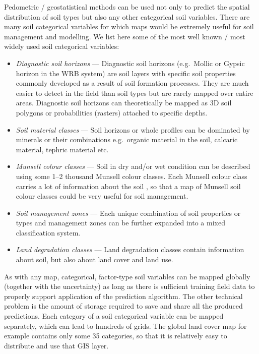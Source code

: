 \documentclass[graybox,natbib,nospthms,UStrade]{svmono}
\begin{document}
Pedometric / geostatistical methods can be used not only to predict the
spatial distribution of soil types but also any other categorical soil
variables. There are many soil categorical variables for which maps
would be extremely useful for soil management and modelling. We list
here some of the most well known / most widely used soil categorical
variables:

\begin{itemize}
\item
  \emph{Diagnostic soil horizons} --- Diagnostic soil horizons (e.g.~Mollic
  or Gypsic horizon in the WRB system) are soil layers with specific
  soil properties commonly developed as a result of soil
  formation processes. They are much easier to detect in the field
  than soil types but are rarely mapped over entire areas. Diagnostic
  soil horizons can theoretically be mapped as 3D soil polygons or
  probabilities (rasters) attached to specific depths.
\item
  \emph{Soil material classes} --- Soil horizons or whole profiles can be
  dominated by minerals or their combinations e.g.~organic material in
  the soil, calcaric material, tephric material etc.
\item
  \emph{Munsell colour classes} --- Soil in dry and/or wet condition can be
  described using some 1--2 thousand Munsell colour classes. Each
  Munsell colour class carries a lot of information about the soil
  \citep{fernandez1988color}, so that a map of Munsell soil colour classes
  could be very useful for soil management.
\item
  \emph{Soil management zones} --- Each unique combination of soil properties
  or types and management zones can be further expanded into a mixed
  classification system.
\item
  \emph{Land degradation classes} --- Land degradation classes contain
  information about soil, but also about land cover and land use.
\end{itemize}

As with any map, categorical, factor-type soil variables can be mapped
globally (together with the uncertainty) as long as there is sufficient
training field data to properly support application of the prediction
algorithm. The other technical problem is the amount of storage required to save and
share all the produced predictions. Each category of a soil categorical
variable can be mapped separately, which can lead to hundreds of grids.
The global land cover map for example contains only some 35 categories,
so that it is relatively easy to distribute and use that GIS layer.
\end{document}
